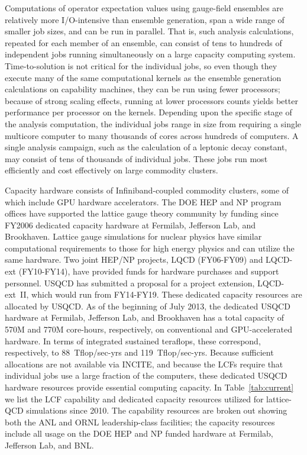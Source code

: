 Computations of operator expectation values using gauge-field ensembles are
relatively more I/O-intensive than ensemble generation, span a wide range of
smaller job sizes, and can be run in parallel.  That is, such analysis
calculations, repeated for each member of an ensemble, can consist of tens to
hundreds of independent jobs running simultaneously on a large capacity
computing system.  Time-to-solution is not critical for the individual jobs,
so even though they execute many of the same computational kernels as the
ensemble generation calculations on capability machines, they can be run using
fewer processors; because of strong scaling effects, running at lower
processors counts yields better performance per processor on the kernels.
Depending upon the specific stage of the analysis computation, the individual
jobs range in size from requiring a single multicore computer to many
thousands of cores across hundreds of computers.  A single analysis campaign,
such as the calculation of a leptonic decay constant, may consist of tens of
thousands of individual jobs.  These jobs run most efficiently and cost
effectively on large commodity clusters.

Capacity hardware consists of Infiniband-coupled commodity clusters, some of
which include GPU hardware
accelerators.  The DOE HEP and NP program offices have supported the lattice
gauge theory community by funding since FY2006 dedicated capacity hardware at
Fermilab, Jefferson Lab, and Brookhaven.  Lattice gauge simulations for
nuclear physics have similar computational requirements to those for high
energy physics and can utilize the same hardware.  Two joint HEP/NP projects,
LQCD (FY06-FY09) and LQCD-ext (FY10-FY14), have provided funds for hardware
purchases and support personnel.  USQCD has submitted a proposal for a project extension, LQCD-ext~II, which would run from FY14-FY19.  These dedicated capacity
resources are allocated by USQCD.  As of the beginning of July 2013, the
dedicated USQCD hardware at Fermilab, Jefferson Lab, and Brookhaven has a
total capacity of 570M and 770M core-hours, respectively, on conventional and
GPU-accelerated hardware.  In terms of integrated sustained teraflops, these
correspond, respectively, to 88~Tflop/sec-yrs and 119~Tflop/sec-yrs.
Because sufficient allocations are not available via INCITE, and because the LCFs require that individual jobs use a large fraction of the computers, these dedicated
USQCD hardware resources provide essential computing capacity.
In Table~\ref{tab:current} we list the LCF capability and dedicated
capacity resources utilized for lattice-QCD simulations since 2010.
The capability resources are broken out showing both the ANL and ORNL
leadership-class facilities; the capacity resources include all usage  on the 
DOE HEP and NP funded hardware at Fermilab, Jefferson Lab, and BNL.

